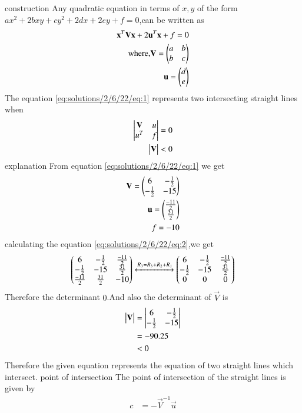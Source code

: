 
{construction}
Any quadratic equation in terms of $x,y$ of the form $ax^2+2bxy+cy^2+2dx+2ey+f=0$,can be written as
\begin{align}
    \mathbf{x}^T\mathbf{V}\mathbf{x}+2\mathbf{u}^T\mathbf{x}+f=0
\\
    \text{where,}
    \mathbf{V}=\begin{pmatrix}a&b\\b&c\end{pmatrix}\\
    \mathbf{u}=\begin{pmatrix}d\\e\end{pmatrix}
\end{align}
The equation \eqref{eq:solutions/2/6/22/eq:1} represents two intersecting straight lines when
\begin{align}
    \begin{vmatrix}\mathbf{V} & u\\u^T &f\end{vmatrix}=0\label{eq:solutions/2/6/22/eq:2}\\
    \begin{vmatrix}\mathbf{V}\end{vmatrix}<0
\end{align}
{explanation}
From equation \eqref{eq:solutions/2/6/22/eq:1} we get
\begin{align}
    \mathbf{V}=\begin{pmatrix}6&-\frac{1}{2}\\-\frac{1}{2}&-15\end{pmatrix}\\
    \mathbf{u}=\begin{pmatrix}\frac{-11}{2}\\ \frac{31}{2}\end{pmatrix}\\
    f=-10
\end{align}
calculating the equation \eqref{eq:solutions/2/6/22/eq:2},we get
\begin{align}
    \begin{pmatrix}6&-\frac{1}{2}&\frac{-11}{2}\\-\frac{1}{2}&-15&\frac{31}{2}\\\frac{-11}{2}&\frac{31}{2}&-10\end{pmatrix}\xleftrightarrow[]{R_3=R_3+R_2+R_1}\begin{pmatrix}6&-\frac{1}{2}&\frac{-11}{2}\\-\frac{1}{2}&-15&\frac{31}{2}\\0&0&0\end{pmatrix}
\end{align}
Therefore the determinant $0$.And also the determinant of $\vec{V}$ is
\begin{align}
    \begin{vmatrix}\mathbf{V}\end{vmatrix}&=\begin{vmatrix}6&-\frac{1}{2}\\-\frac{1}{2}&-15\end{vmatrix}\\
    &=-90.25\\
    &<0
\end{align}
Therefore the given equation represents the equation of two straight lines which intersect.
{point of intersection}
The point of intersection of the straight lines is given by 
\begin{align}
    c&=-\vec{V}^{-1}\vec{u}
\end{align}
